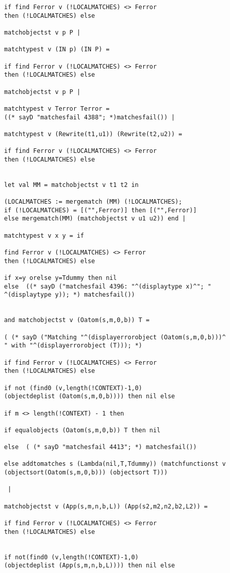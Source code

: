 \documentclass[12pt]{article}
\begin{document}
\begin{verbatim}
if find Ferror v (!LOCALMATCHES) <> Ferror 
then (!LOCALMATCHES) else

matchobjectst v p P |

matchtypest v (IN p) (IN P) = 

if find Ferror v (!LOCALMATCHES) <> Ferror 
then (!LOCALMATCHES) else

matchobjectst v p P |

matchtypest v Terror Terror = 
((* sayD "matchesfail 4388"; *)matchesfail()) |

matchtypest v (Rewrite(t1,u1)) (Rewrite(t2,u2)) =

if find Ferror v (!LOCALMATCHES) <> Ferror 
then (!LOCALMATCHES) else


let val MM = matchobjectst v t1 t2 in

(LOCALMATCHES := mergematch (MM) (!LOCALMATCHES);
if (!LOCALMATCHES) = [("",Ferror)] then [("",Ferror)]
else mergematch(MM) (matchobjectst v u1 u2)) end |

matchtypest v x y = if 

find Ferror v (!LOCALMATCHES) <> Ferror 
then (!LOCALMATCHES) else

if x=y orelse y=Tdummy then nil 
else  ((* sayD ("matchesfail 4396: "^(displaytype x)^"; "
^(displaytype y)); *) matchesfail())


and matchobjectst v (Oatom(s,m,0,b)) T = 

( (* sayD ("Matching "^(displayerrorobject (Oatom(s,m,0,b)))^
" with "^(displayerrorobject (T))); *) 

if find Ferror v (!LOCALMATCHES) <> Ferror 
then (!LOCALMATCHES) else

if not (find0 (v,length(!CONTEXT)-1,0) 
(objectdeplist (Oatom(s,m,0,b)))) then nil else

if m <> length(!CONTEXT) - 1 then

if equalobjects (Oatom(s,m,0,b)) T then nil

else  ( (* sayD "matchesfail 4413"; *) matchesfail())

else addtomatches s (Lambda(nil,T,Tdummy)) (matchfunctionst v 
(objectsort(Oatom(s,m,0,b))) (objectsort T)))

 |

matchobjectst v (App(s,m,n,b,L)) (App(s2,m2,n2,b2,L2)) =

if find Ferror v (!LOCALMATCHES) <> Ferror 
then (!LOCALMATCHES) else


if not(find0 (v,length(!CONTEXT)-1,0) 
(objectdeplist (App(s,m,n,b,L)))) then nil else


\end{verbatim}
\end{document}
